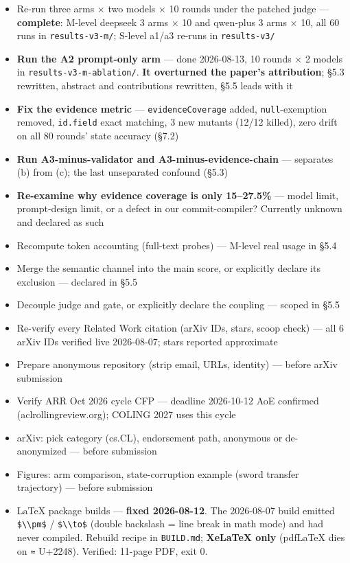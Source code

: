 \documentclass[
  english,
]{article}
\providecommand{\tightlist}{%
  \setlength{\itemsep}{0pt}\setlength{\parskip}{0pt}}
\begin{document}
\begin{itemize}
\tightlist
\item[$\boxtimes$]
  Re-run three arms × two models × 10 rounds under the patched judge ---
  \textbf{complete}: M-level deepseek 3 arms × 10 and qwen-plus 3 arms ×
  10, all 60 runs in \texttt{results-v3-m/}; S-level a1/a3 re-runs in
  \texttt{results-v3/}
\item[$\boxtimes$]
  \textbf{Run the A2 prompt-only arm} --- done 2026-08-13, 10 rounds × 2
  models in \texttt{results-v3-m-ablation/}. \textbf{It overturned the
  paper's attribution}; §5.3 rewritten, abstract and contributions
  rewritten, §5.5 leads with it
\item[$\boxtimes$]
  \textbf{Fix the evidence metric} --- \texttt{evidenceCoverage} added,
  \texttt{null}-exemption removed, \texttt{id.field} exact matching, 3
  new mutants (12/12 killed), zero drift on all 80 rounds' state
  accuracy (§7.2)
\item[$\square$]
  \textbf{Run A3-minus-validator and A3-minus-evidence-chain} ---
  separates (b) from (c); the last unseparated confound (§5.3)
\item[$\square$]
  \textbf{Re-examine why evidence coverage is only 15--27.5\%} --- model
  limit, prompt-design limit, or a defect in our commit-compiler?
  Currently unknown and declared as such
\item[$\boxtimes$]
  Recompute token accounting (full-text probes) --- M-level real usage
  in §5.4
\item[$\boxtimes$]
  Merge the semantic channel into the main score, or explicitly declare
  its exclusion --- declared in §5.5
\item[$\boxtimes$]
  Decouple judge and gate, or explicitly declare the coupling --- scoped
  in §5.5
\item[$\boxtimes$]
  Re-verify every Related Work citation (arXiv IDs, stars, scoop check)
  --- all 6 arXiv IDs verified live 2026-08-07; stars reported
  approximate
\item[$\square$]
  Prepare anonymous repository (strip email, URLs, identity) --- before
  arXiv submission
\item[$\boxtimes$]
  Verify ARR Oct 2026 cycle CFP --- deadline 2026-10-12 AoE confirmed
  (aclrollingreview.org); COLING 2027 uses this cycle
\item[$\square$]
  arXiv: pick category (cs.CL), endorsement path, anonymous or
  de-anonymized --- before submission
\item[$\square$]
  Figures: arm comparison, state-corruption example (sword transfer
  trajectory) --- before submission
\item[$\boxtimes$]
  LaTeX package builds --- \textbf{fixed 2026-08-12}. The 2026-08-07
  build emitted \texttt{\$\textbackslash{}\textbackslash{}pm\$} /
  \texttt{\$\textbackslash{}\textbackslash{}to\$} (double backslash =
  line break in math mode) and had never compiled. Rebuild recipe in
  \texttt{BUILD.md}; \textbf{XeLaTeX only} (pdfLaTeX dies on \texttt{≈}
  U+2248). Verified: 11-page PDF, exit 0.
\end{itemize}
\end{document}
